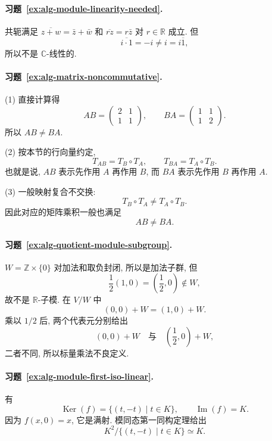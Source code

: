 \documentclass[usesamecnt, thmcnt=section, lang=cn, newtx, 10pt, scheme=chinese]{elegantbook}
\begin{document}
\paragraph*{习题~\ref{ex:alg-module-linearity-needed}.}
共轭满足 $\overline{z+w}=\bar z+\bar w$ 和 $\overline{rz}=r\bar z$ 对 $r\in\mathbb R$ 成立. 但
\[
 \overline{i\cdot1}=-i\neq i=i\overline1,
\]
所以不是 $\mathbb C$-线性的.

\paragraph*{习题~\ref{ex:alg-matrix-noncommutative}.}
(1) 直接计算得
\[
 AB=\begin{pmatrix}2&1\\1&1\end{pmatrix},
 \qquad
 BA=\begin{pmatrix}1&1\\1&2\end{pmatrix}.
\]
所以 $AB\neq BA$.

(2) 按本节的行向量约定,
\[
 T_{AB}=T_B\circ T_A,
 \qquad
 T_{BA}=T_A\circ T_B.
\]
也就是说, $AB$ 表示先作用 $A$ 再作用 $B$, 而 $BA$ 表示先作用 $B$ 再作用 $A$.

(3) 一般映射复合不交换:
\[
 T_B\circ T_A
 \neq
 T_A\circ T_B.
\]
因此对应的矩阵乘积一般也满足
\[
 AB\neq BA.
\]


\paragraph*{习题~\ref{ex:alg-quotient-module-subgroup}.}
$W=\mathbb Z\times\{0\}$ 对加法和取负封闭, 所以是加法子群, 但
\[
 \frac12(1,0)=\left(\frac12,0\right)\notin W,
\]
故不是 $\mathbb R$-子模. 在 $V/W$ 中
\[
 (0,0)+W=(1,0)+W.
\]
乘以 $1/2$ 后, 两个代表元分别给出
\[
 (0,0)+W
 \quad\text{与}\quad
 \left(\frac12,0\right)+W,
\]
二者不同, 所以标量乘法不良定义.

\paragraph*{习题~\ref{ex:alg-module-first-iso-linear}.}
有
\[
 \operatorname{Ker}(f)=\{(t,-t)\mid t\in K\},
 \qquad
 \operatorname{Im}(f)=K.
\]
因为 $f(x,0)=x$, 它是满射. 模同态第一同构定理给出
\[
 K^2/\{(t,-t)\mid t\in K\}\simeq K.
\]
\end{document}
